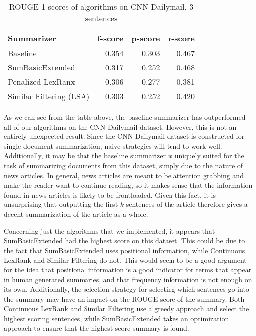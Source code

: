 \documentclass[../writeup.tex]{subfiles}
\begin{document}
\begin{table}[h]
    \centering
    \begin{tabular}{lrrr}
        \hline
        Summarizer              & f-score                       & p-score                       & r-score                       \\
        \hline
        Baseline                & \cellcolor[HTML]{F8FF00}0.354 & \cellcolor[HTML]{F8FF00}0.303 & 0.467                         \\
        SumBasicExtended        & 0.317                         & 0.252                         & \cellcolor[HTML]{F8FF00}0.468 \\
        Penalized LexRanx       & 0.306                         & 0.277                         & 0.381                         \\
        Similar Filtering (LSA) & 0.303                         & 0.252                         & 0.420                         \\
        \hline
    \end{tabular}

    \caption{ROUGE-1 scores of algorithms on CNN Dailymail, 3 sentences}
    \label{group:table:cnn_compare}
\end{table}

As we can see from the table above, the baseline summarizer has outperformed all of our algorithms on the CNN Dailymail dataset.
However, this is not an entirely unexpected result.
Since the CNN Dailymail dataset is constructed for single document summarization, naive strategies will tend to work well.
Additionally, it may be that the baseline summarizer is uniquely suited for the task of summarizing documents from this dataset, simply due to the nature of news articles.
In general, news articles are meant to be attention grabbing and make the reader want to continue reading, so it makes sense that the information found in news articles is likely to be frontloaded.
Given this fact, it is unsurprising that outputting the first $k$ sentences of the article therefore gives a decent summarization of the article as a whole.

Concerning just the algorithms that we implemented, it appears that SumBasicExtended had the highest score on this dataset.
This could be due to the fact that SumBasicExtended uses positional information, while Continuous LexRank and Similar Filtering do not.
This would seem to be a good argument for the idea that positional information is a good indicator for terms that appear in human generated summaries, and that frequency information is not enough on its own.
Additionally, the selection strategy for selecting which sentences go into the summary may have an impact on the ROUGE score of the summary.
Both Continuous LexRank and Similar Filtering use a greedy approach and select the highest scoring sentences, while SumBasicExtended takes an optimization approach to ensure that the highest score summary is found.
\end{document}
